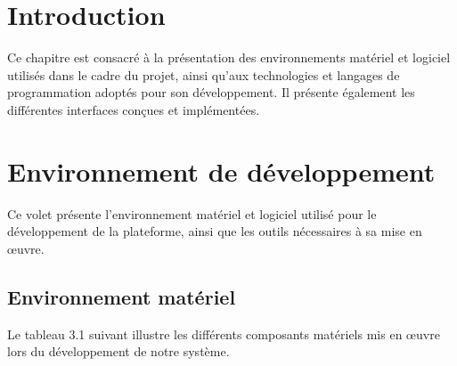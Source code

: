 

\renewcommand{\thesection}{\arabic{section}}

\section{Introduction}

Ce chapitre est consacré à la présentation des environnements matériel et logiciel utilisés dans le cadre du projet, ainsi qu'aux technologies et langages de programmation adoptés pour son développement. Il présente également les différentes interfaces conçues et implémentées.

\section{Environnement de développement}
Ce volet présente l’environnement matériel et logiciel utilisé pour le développement de la plateforme, ainsi que les outils nécessaires à sa mise en œuvre. 
\subsection{Environnement matériel}

Le tableau 3.1 suivant illustre les différents composants matériels mis en œuvre lors du développement de notre système.


